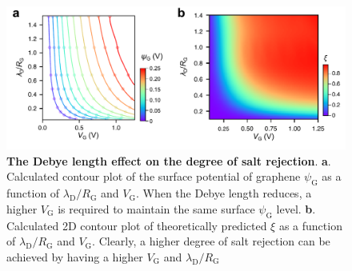 \documentclass[journal=langd5,email=true, hyperref=true, keywords=false]{achemso}
\begin{document}
\begin{figure}[htbp]
  \centering
  \includegraphics[width=0.95\linewidth]{img/fig5.pdf}
  \caption{\textbf{The Debye length effect on the degree of salt
      rejection}. \textbf{a}. Calculated contour plot of the surface
    potential of graphene $\psi_{\mathrm{G}}$ as a function of
    $\lambda_{\mathrm{D}}/R_{\mathrm{G}}$ and $V_{\mathrm{G}}$. When
    the Debye length reduces, a higher $V_{\mathrm{G}}$ is required to
    maintain the same surface $\psi_{\mathrm{G}}$
    level. \textbf{b}. Calculated 2D contour plot of theoretically
    predicted $\xi$ as a function of
    $\lambda_{\mathrm{D}}/R_{\mathrm{G}}$ and
    $V_{\mathrm{G}}$. Clearly, a higher degree of salt rejection can
    be achieved by having a higher $V_{\mathrm{G}}$ and
    $\lambda_{\mathrm{D}}/R_{\mathrm{G}}$}
  \label{fig:5}
\end{figure}
\end{document}

